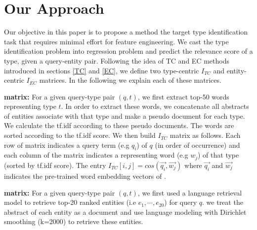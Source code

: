 \section{Our Approach}
Our objective in this paper is to propose a method the target type identification task that requires minimal effort for feature engineering.  We cast the type identification problem into regression problem and predict the relevance score of a type, given a query-entity pair.
Following the idea of TC and EC methods introduced in sections \ref{TC} and \ref{EC}, we define two type-centric $I_{TC}$ and entity-centric $I_{EC}$ matrices.  In the following we explain each of these matrices.%

%
 \textbf{matrix:} For a given query-type pair $(q,t)$, we first extract top-50 words representing type $t$. In order to extract these words, we concatenate all abstracts of entities associate with that type and make a pseudo document for each type. We calculate the tf.idf according to these pseudo documents. The words are sorted according to the tf.idf score. We then build $I_{TC}$ matrix as follows. Each row of matrix indicates a query term (e.g $q_i$) of $q$ (in order of occurrence) and each column of the matrix indicates a representing word (e.g $w_j$) of that type (sorted by tf.idf score). The entry $I_{TC}[i,j] = cos(\vec{q_i}, \vec{w_j})$ where $\vec{q_i}$ and $\vec{w_j}$ indicates the pre-trained word embedding vectors of \cite{Mikolov:2013:DRW:2999792.2999959}.

 \textbf{matrix:} For a given query-type pair $(q,t)$, we first used a language retrieval model to retrieve top-20 ranked entities (i.e $e_1,\cdots, e_{20}$) for query $q$.
we treat the abstract of each entity as a document and use language modeling with Dirichlet smoothing (k=2000) to retrieve these entities.

